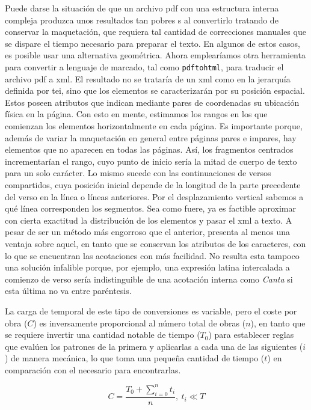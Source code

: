 Puede darse la situación de que un archivo  \ac{pdf} con una estructura interna compleja produzca unos resultados tan pobres s al convertirlo tratando de conservar la maquetación, que requiera tal cantidad de correcciones manuales que se dispare el tiempo necesario para preparar el texto. En algunos de estos casos, es posible usar una alternativa geométrica. Ahora emplearíamos otra herramienta para convertir a lenguaje de marcado, tal como \texttt{pdftohtml}, para traducir el archivo \ac{pdf} a \ac{xml}. El resultado no se trataría de un \ac{xml} como en la jerarquía definida por \ac{tei}, sino que los elementos se caracterizarán por su posición espacial. Estos poseen atributos que indican mediante pares de coordenadas su ubicación física en la página. Con esto en mente, estimamos los rangos en los que comienzan los elementos horizontalmente en cada página. Es importante porque, además de variar la maquetación en general entre páginas pares e impares, hay elementos que no aparecen en todas las páginas. Así, los fragmentos centrados incrementarían el rango, cuyo punto de inicio sería la mitad de cuerpo de texto para un solo carácter. Lo mismo sucede con las continuaciones de versos compartidos, cuya posición inicial depende de la longitud de la parte precedente del verso en la línea o líneas anteriores.  Por el desplazamiento vertical sabemos a qué línea corresponden los segmentos. Sea como fuere, ya es factible aproximar con cierta exactitud la distribución de los elementos y pasar el \ac{xml} a texto. A pesar de ser un método más engorroso que el anterior, presenta al menos una ventaja sobre aquel, en tanto que se conservan los atributos de los caracteres, con lo que se encuentran las acotaciones con más facilidad. No resulta esta tampoco una solución infalible porque, por ejemplo, una expresión latina intercalada a comienzo de verso sería indistinguible de una acotación interna como \textit{Canta} si esta última no va entre paréntesis.

La carga de temporal de este tipo de conversiones es variable, pero el coste por obra ($C$) es inversamente proporcional al número total de obras ($n$), en tanto que se requiere invertir una cantidad notable de tiempo ($T_0$) para establecer reglas que evalúen los patrones de la primera y aplicarlas a cada una de las siguientes ($i$) de manera mecánica, lo que toma una pequeña cantidad de tiempo ($t$) en comparación con el necesario para encontrarlas.  

\begin{equation}\label{eq:tiempo}
C = \frac{T_0 + \sum_{i=0}^{n} t_i}{n},\: t_i \ll T
\end{equation}

